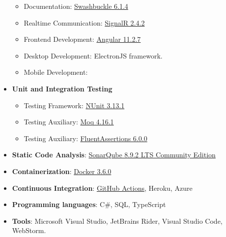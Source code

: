 \begin{itemize}
    \begin{itemize}
        \item Documentation: \href{https://www.nuget.org/packages/Swashbuckle.AspNetCore/5.6.3?_src=template}{Swashbuckle 6.1.4}
        \item Realtime Communication: \href{https://www.nuget.org/packages/Microsoft.AspNet.SignalR/}{SignalR 2.4.2}
        \item Frontend Development: \href{https://angular.io/guide/setup-local}{Angular 11.2.7}
        \item Desktop Development: ElectronJS framework.
        \item Mobile Development:
    \end{itemize}
    \item \textbf{Unit and Integration Testing}
    \begin{itemize}
        \item Testing Framework: \href{https://www.nuget.org/packages/NUnit/}{NUnit 3.13.1}
        \item Testing Auxiliary: \href{https://www.nuget.org/packages/Moq/}{Moq 4.16.1}
        \item Testing Auxiliary: \href{https://www.nuget.org/packages/FluentAssertions}{FluentAssertions 6.0.0}
    \end{itemize}
    \item \textbf{Static Code Analysis}: \href{https://www.sonarqube.org/downloads/}{SonarQube 8.9.2 LTS Community Edition}
    \item \textbf{Containerization}: \href{https://docs.docker.com/desktop/windows/install/}{Docker 3.6.0}
    \item \textbf{Continuous Integration}: \href{https://docs.github.com/en/actions}{GitHub Actions}, Heroku, Azure
    \item \textbf{Programming languages}: C\#, SQL, TypeScript
    \item \textbf{Tools}: Microsoft Visual Studio, JetBrains Rider, Visual Studio Code, WebStorm.
\end{itemize}